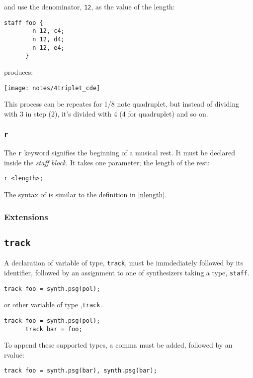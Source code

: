 and use the denominator, \verb+12+, as the value of the length:
\begin{Verbatim}[frame=single]
      staff foo {
        n 12, c4;
        n 12, d4;
        n 12, e4;
      }
\end{Verbatim}

produces:

\begin{center}
\texttt{[image: notes/4triplet\_cde]}
\end{center}

This process can be repeates for 1/8 note quadruplet, but instead of dividing
with 3 in step (2), it's divided with 4 (4 for quadruplet) and so on.


\subsubsection{\texttt{r}}

\np The \verb+r+ keyword signifies the beginning of a musical rest. It must be
declared inside the \textit{staff block}. It takes one parameter; the
length of the rest:

\begin{Verbatim}[frame=single]
      r <length>;
\end{Verbatim}

\np The syntax of  is similar to the definition in 
\autoref{nlength}.

\subsubsection{Extensions}

\subsection{\texttt{track}}
\np A declaration of variable of type,
\verb+track+, must be immdediately followed by its identifier, followed by
an assignment to one of synthesizers taking a type, \verb+staff+. 
\begin{Verbatim}[frame=single]
       track foo = synth.psg(pol);
\end{Verbatim}

or other variable of type ,\verb+track+.
\begin{Verbatim}[frame=single]
      track foo = synth.psg(pol);
      track bar = foo;
\end{Verbatim}

\np To append these supported types, a comma must be added, followed by an rvalue:
\begin{Verbatim}[frame=single]
      track foo = synth.psg(bar), synth.psg(bar);
\end{Verbatim}


